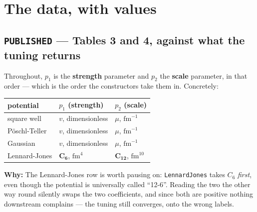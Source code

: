 \documentclass[11pt,a4paper]{article}
\newcommand{\why}[1]{\medskip\noindent\textbf{Why:} #1\medskip}
\begin{document}
\section{The data, with values}

\subsection*{\texttt{PUBLISHED} --- Tables 3 and 4, against what the tuning returns}
Throughout, $p_1$ is the \textbf{strength} parameter and $p_2$ the
\textbf{scale} parameter, in that order --- which is the order the constructors
take them in. Concretely:

\begin{center}
\begin{tabular}{lll}
\toprule
potential & $p_1$ (strength) & $p_2$ (scale) \\
\midrule
square well & $v$, dimensionless & $\mu$, $\mathrm{fm}^{-1}$ \\
Pöschl-Teller & $v$, dimensionless & $\mu$, $\mathrm{fm}^{-1}$ \\
Gaussian & $v$, dimensionless & $\mu$, $\mathrm{fm}^{-1}$ \\
Lennard-Jones & $\boldsymbol{C_6}$, $\mathrm{fm}^{4}$ & $\boldsymbol{C_{12}}$, $\mathrm{fm}^{10}$ \\
\bottomrule
\end{tabular}
\end{center}

\why{The Lennard-Jones row is worth pausing on: \texttt{LennardJones} takes
$C_6$ \emph{first}, even though the potential is universally called ``12-6''.
Reading the two the other way round silently swaps the two coefficients, and
since both are positive nothing downstream complains --- the tuning still
converges, onto the wrong labels.}
\end{document}
